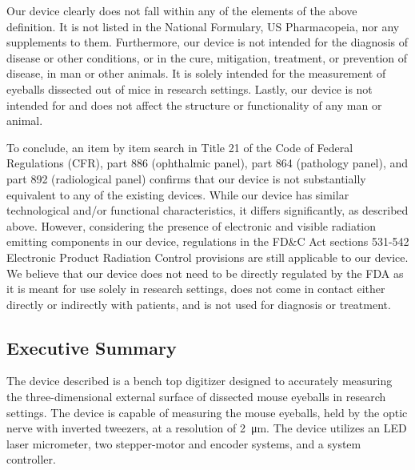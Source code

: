 \documentclass{article}
\begin{document}
Our device clearly does not fall within any of the elements of the
above definition. It is not listed in the National Formulary, US
Pharmacopeia, nor any supplements to them. Furthermore, our device is
not intended for the diagnosis of disease or other conditions, or in
the cure, mitigation, treatment, or prevention of disease, in man or
other animals. It is solely intended for the measurement of eyeballs
dissected out of mice in research settings. Lastly, our device is not
intended for and does not affect the structure or functionality of
any man or animal. 

To conclude, an item by item search in Title 21 of the Code of Federal
Regulations (CFR), part 886 (ophthalmic panel), part 864 (pathology
panel), and part 892 (radiological panel) confirms that our device is
not substantially equivalent to any of the existing devices. While our
device has similar technological and/or functional characteristics, it
differs significantly, as described above. However, considering the
presence of electronic and visible radiation emitting components in
our device, regulations in the FD\&C Act sections 531-542 Electronic
Product Radiation Control provisions are still applicable to our
device. We believe that our device does not need to be directly
regulated by the FDA as it is meant for use solely in research
settings, does not come in contact either directly or indirectly with
patients, and is not used for diagnosis or treatment. 

\appendix









\newpage
\setcounter{subsection}{0}
\subsection{Executive Summary}
The device described is a bench top digitizer designed to accurately
measuring the three-dimensional external surface of dissected mouse
eyeballs in research settings. The device is capable of measuring the
mouse eyeballs, held by the optic nerve with inverted tweezers, at a
resolution of \SI{2}{\micro m}. The device utilizes an LED laser
micrometer, two stepper-motor and encoder systems, and a system
controller. 
\end{document}

